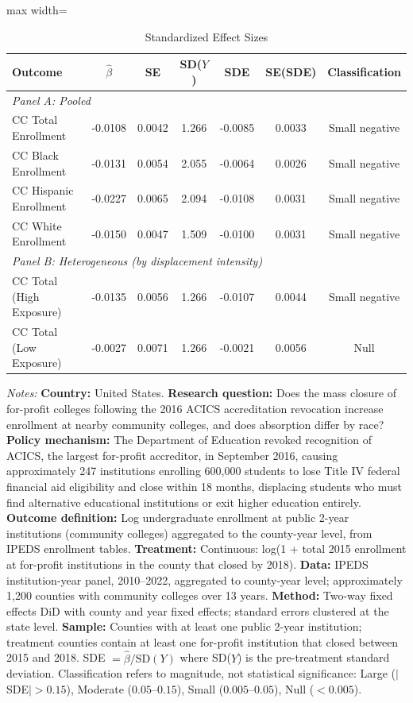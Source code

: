 \begin{table}[htbp]
\centering
\caption{Standardized Effect Sizes}
\label{tab:sde}
\begin{adjustbox}{max width=\textwidth}
\begin{threeparttable}
\begin{tabular}{l cccccc}
\toprule
Outcome & $\hat{\beta}$ & SE & SD($Y$) & SDE & SE(SDE) & Classification \\
\midrule
\multicolumn{7}{l}{\textit{Panel A: Pooled}} \\
CC Total Enrollment & -0.0108 & 0.0042 & 1.266 & -0.0085 & 0.0033 & Small negative \\
CC Black Enrollment & -0.0131 & 0.0054 & 2.055 & -0.0064 & 0.0026 & Small negative \\
CC Hispanic Enrollment & -0.0227 & 0.0065 & 2.094 & -0.0108 & 0.0031 & Small negative \\
CC White Enrollment & -0.0150 & 0.0047 & 1.509 & -0.0100 & 0.0031 & Small negative \\
\midrule
\multicolumn{7}{l}{\textit{Panel B: Heterogeneous (by displacement intensity)}} \\
CC Total (High Exposure) & -0.0135 & 0.0056 & 1.266 & -0.0107 & 0.0044 & Small negative \\
CC Total (Low Exposure) & -0.0027 & 0.0071 & 1.266 & -0.0021 & 0.0056 & Null \\
\bottomrule
\end{tabular}
\begin{tablenotes}[flushleft]
\footnotesize
\item \textit{Notes:} \textbf{Country:} United States. \textbf{Research question:} Does the mass closure of for-profit colleges following the 2016 ACICS accreditation revocation increase enrollment at nearby community colleges, and does absorption differ by race? \textbf{Policy mechanism:} The Department of Education revoked recognition of ACICS, the largest for-profit accreditor, in September 2016, causing approximately 247 institutions enrolling 600,000 students to lose Title IV federal financial aid eligibility and close within 18 months, displacing students who must find alternative educational institutions or exit higher education entirely. \textbf{Outcome definition:} Log undergraduate enrollment at public 2-year institutions (community colleges) aggregated to the county-year level, from IPEDS enrollment tables. \textbf{Treatment:} Continuous: log(1 + total 2015 enrollment at for-profit institutions in the county that closed by 2018). \textbf{Data:} IPEDS institution-year panel, 2010--2022, aggregated to county-year level; approximately 1,200 counties with community colleges over 13 years. \textbf{Method:} Two-way fixed effects DiD with county and year fixed effects; standard errors clustered at the state level. \textbf{Sample:} Counties with at least one public 2-year institution; treatment counties contain at least one for-profit institution that closed between 2015 and 2018. SDE $= \hat{\beta} / \text{SD}(Y)$ where SD($Y$) is the pre-treatment standard deviation. Classification refers to magnitude, not statistical significance: Large ($|$SDE$| > 0.15$), Moderate ($0.05$--$0.15$), Small ($0.005$--$0.05$), Null ($< 0.005$).

\end{tablenotes}
\end{threeparttable}
\end{adjustbox}
\end{table}
